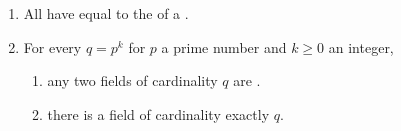 \begin{theorem} \label{theorem:finite_fields_are_exactly_characterized_by_their_cardinality}
    \begin{enumerate}
        \item All  have  equal to the  of a .

        \item For every $q = p^k$ for $p$ a prime number and $k \geq 0$ an integer,
        \begin{enumerate}
            \item any two fields of cardinality $q$ are .

            \item there is a field of cardinality exactly $q$.
        \end{enumerate}
    \end{enumerate}
\end{theorem}
